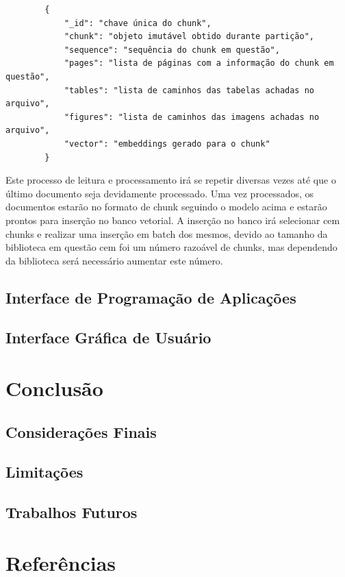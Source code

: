 \documentclass[a4paper, 12pt]{article}
\begin{document}
    \begin{lstlisting}
        {
            "_id": "chave única do chunk",
            "chunk": "objeto imutável obtido durante partição",
            "sequence": "sequência do chunk em questão",
            "pages": "lista de páginas com a informação do chunk em questão",
            "tables": "lista de caminhos das tabelas achadas no arquivo",
            "figures": "lista de caminhos das imagens achadas no arquivo",
            "vector": "embeddings gerado para o chunk"
        }
    \end{lstlisting}

    Este processo de leitura e processamento irá se repetir diversas vezes até que o último documento seja devidamente processado. Uma vez processados, os documentos estarão no formato de chunk seguindo o modelo acima e estarão prontos para inserção no banco vetorial. A inserção no banco irá selecionar cem chunks e realizar uma inserção em batch dos mesmos, devido ao tamanho da biblioteca em questão cem foi um número razoável de chunks, mas dependendo da biblioteca será necessário aumentar este número.

    \subsection{Interface de Programação de Aplicações}
    \lipsum[3-4]

    \subsection{Interface Gráfica de Usuário}
    \lipsum[5-6]

    \clearpage

    \section{Conclusão}
    \subsection{Considerações Finais}
    \lipsum[1-2]
    \subsection{Limitações}
    \lipsum[3-4]
    \subsection{Trabalhos Futuros}
    \lipsum[5-6]

    \clearpage

    \section*{Referências}

    \nocite{*}

    \sectionfont{\raggedright}
    \printbibliography
    
\end{document}
